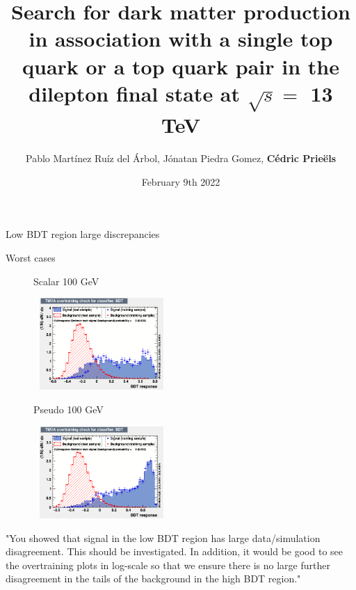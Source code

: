 \documentclass[8pt]{beamer}
\title{Search for dark matter production in association with a single top quark or a top quark pair in the dilepton final state at $\sqrt{s} = $ 13 TeV}
\date{\vspace{-3pt}February 9th 2022}
\author{Pablo Mart\'{i}nez Ru\'{i}z del \'{A}rbol, J\'{o}natan Piedra Gomez, \textbf{C\'{e}dric Prie\"{e}ls}}
\institute{Thesis Endorsement - Answer to questions \\ Instituto de F\'{i}sica de Cantabria}
\begin{document}
\maketitle

\begin{frame}{Low BDT region large discrepancies}
\justifying
\begin{block}{\centering Worst cases}\end{block} \vspace{-10pt}
\begin{figure}[htbp]
\centering
\begin{minipage}[b]{.49\textwidth}
\vspace{-5pt}
\begin{block}{\centering Scalar 100 GeV}\end{block}
\begin{center}
\includegraphics[width=5.2cm, height=3.5cm]{figs/overtraining_scalar100_TTbar.png}
\end{center}
\end{minipage}
\begin{minipage}[b]{.02\textwidth}\end{minipage}
\begin{minipage}[b]{.49\textwidth}
\vspace{-5pt}
\begin{block}{\centering Pseudo 100 GeV}\end{block}
\begin{center}
\includegraphics[width=5.2cm, height=3.5cm]{figs/overtraining_scalar500_TTbar.png}
\end{center}
\end{minipage}
\end{figure}

"You showed that signal in the low BDT region has large
data/simulation disagreement. This should be investigated. In addition,
it would be good to see the overtraining plots in log-scale so that we
ensure there is no large further disagreement in the tails of the
background in the high BDT region."
\end{frame}
\end{document}
